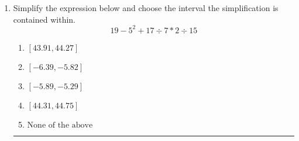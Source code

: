 \documentclass[14pt]{extbook}
\newcommand{\litem}[1]{\item#1\hspace*{-1cm}\rule{\textwidth}{0.4pt}}
\begin{document}
\begin{enumerate}
\litem{
Simplify the expression below and choose the interval the simplification is contained within.\[ 19 - 5^2 + 17 \div 7 * 2 \div 15 \]\begin{enumerate}[label=\Alph*.]
\item \( [43.91, 44.27] \)
\item \( [-6.39, -5.82] \)
\item \( [-5.89, -5.29] \)
\item \( [44.31, 44.75] \)
\item \( \text{None of the above} \)

\end{enumerate} }
\end{enumerate}
\end{document}
